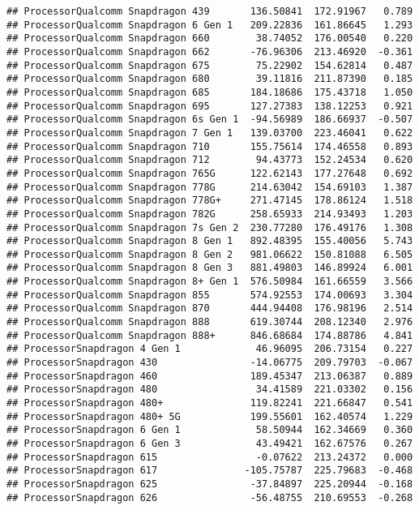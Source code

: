\documentclass[
]{article}
\begin{document}
\begin{verbatim}
## ProcessorQualcomm Snapdragon 439       136.50841  172.91967   0.789
## ProcessorQualcomm Snapdragon 6 Gen 1   209.22836  161.86645   1.293
## ProcessorQualcomm Snapdragon 660        38.74052  176.00540   0.220
## ProcessorQualcomm Snapdragon 662       -76.96306  213.46920  -0.361
## ProcessorQualcomm Snapdragon 675        75.22902  154.62814   0.487
## ProcessorQualcomm Snapdragon 680        39.11816  211.87390   0.185
## ProcessorQualcomm Snapdragon 685       184.18686  175.43718   1.050
## ProcessorQualcomm Snapdragon 695       127.27383  138.12253   0.921
## ProcessorQualcomm Snapdragon 6s Gen 1  -94.56989  186.66937  -0.507
## ProcessorQualcomm Snapdragon 7 Gen 1   139.03700  223.46041   0.622
## ProcessorQualcomm Snapdragon 710       155.75614  174.46558   0.893
## ProcessorQualcomm Snapdragon 712        94.43773  152.24534   0.620
## ProcessorQualcomm Snapdragon 765G      122.62143  177.27648   0.692
## ProcessorQualcomm Snapdragon 778G      214.63042  154.69103   1.387
## ProcessorQualcomm Snapdragon 778G+     271.47145  178.86124   1.518
## ProcessorQualcomm Snapdragon 782G      258.65933  214.93493   1.203
## ProcessorQualcomm Snapdragon 7s Gen 2  230.77280  176.49176   1.308
## ProcessorQualcomm Snapdragon 8 Gen 1   892.48395  155.40056   5.743
## ProcessorQualcomm Snapdragon 8 Gen 2   981.06622  150.81088   6.505
## ProcessorQualcomm Snapdragon 8 Gen 3   881.49803  146.89924   6.001
## ProcessorQualcomm Snapdragon 8+ Gen 1  576.50984  161.66559   3.566
## ProcessorQualcomm Snapdragon 855       574.92553  174.00693   3.304
## ProcessorQualcomm Snapdragon 870       444.94408  176.98196   2.514
## ProcessorQualcomm Snapdragon 888       619.30744  208.12340   2.976
## ProcessorQualcomm Snapdragon 888+      846.68684  174.88786   4.841
## ProcessorSnapdragon 4 Gen 1             46.96095  206.73154   0.227
## ProcessorSnapdragon 430                -14.06775  209.79703  -0.067
## ProcessorSnapdragon 460                189.45347  213.06387   0.889
## ProcessorSnapdragon 480                 34.41589  221.03302   0.156
## ProcessorSnapdragon 480+               119.82241  221.66847   0.541
## ProcessorSnapdragon 480+ 5G            199.55601  162.40574   1.229
## ProcessorSnapdragon 6 Gen 1             58.50944  162.34669   0.360
## ProcessorSnapdragon 6 Gen 3             43.49421  162.67576   0.267
## ProcessorSnapdragon 615                 -0.07622  213.24372   0.000
## ProcessorSnapdragon 617               -105.75787  225.79683  -0.468
## ProcessorSnapdragon 625                -37.84897  225.20944  -0.168
## ProcessorSnapdragon 626                -56.48755  210.69553  -0.268

\end{verbatim}
\end{document}

